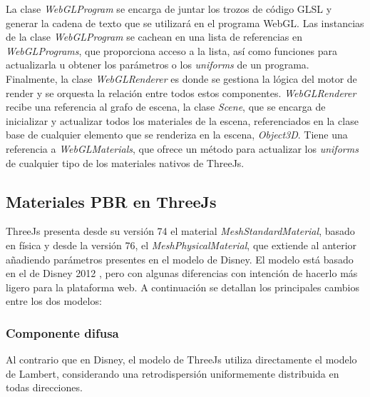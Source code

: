 La clase \textit{WebGLProgram} se encarga de juntar los trozos de c\'odigo GLSL y generar la cadena de texto que se utilizar\'a en
el programa WebGL. Las instancias de la clase \textit{WebGLProgram} se cachean en una lista de referencias en \textit{WebGLPrograms}, que proporciona
acceso a la lista, as\'i como funciones para actualizarla u obtener los par\'ametros o los \textit{uniforms} de un programa. \\

Finalmente, la clase \textit{WebGLRenderer} es donde se gestiona la l\'ogica del motor de render y se orquesta la relaci\'on entre todos
estos componentes. \textit{WebGLRenderer} recibe una referencia al grafo de escena, la clase \textit{Scene}, que se encarga de inicializar
y actualizar todos los materiales de la escena, referenciados en la clase base de cualquier elemento que se renderiza en la escena, \textit{Object3D}.
Tiene una referencia a \textit{WebGLMaterials}, que ofrece un m\'etodo para actualizar los \textit{uniforms} de cualquier tipo
de los materiales nativos de ThreeJs.





\subsection{Materiales PBR en ThreeJs}
ThreeJs presenta desde su versi\'on 74 el material \textit{MeshStandardMaterial}, basado en f\'isica y desde la versi\'on
76, el \textit{MeshPhysicalMaterial}, que extiende al anterior a\~nadiendo par\'ametros presentes en el modelo de Disney.
El modelo est\'a basado en el de Disney 2012 \autocite{disney12}, pero con algunas diferencias con intenci\'on de hacerlo m\'as ligero
para la plataforma web. A continuaci\'on se detallan los principales cambios entre los dos modelos:

  \subsubsection{Componente difusa}
  Al contrario que en Disney, el modelo de ThreeJs utiliza directamente el modelo de Lambert, considerando una retrodispersi\'on
  uniformemente distribuida en todas direcciones.\\

